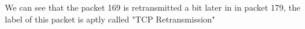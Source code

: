 We can see that the packet 169 is retransmitted a bit later in in packet 179, the label of this packet is aptly called "TCP Retransmission"